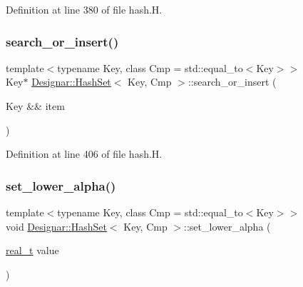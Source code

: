 Definition at line 380 of file hash.\+H.

\mbox{\label{class_designar_1_1_hash_set_a9ecd2f2a1e299cc35e90c66c8357beff}} 
\subsubsection{\texorpdfstring{search\+\_\+or\+\_\+insert()}{search\_or\_insert()}\hspace{0.1cm}{\footnotesize\ttfamily [2/2]}}
{\footnotesize\ttfamily template$<$typename Key, class Cmp = std\+::equal\+\_\+to$<$\+Key$>$$>$ \\
Key$\ast$ \hyperlink{class_designar_1_1_hash_set}{Designar\+::\+Hash\+Set}$<$ Key, Cmp $>$\+::search\+\_\+or\+\_\+insert (\begin{DoxyParamCaption}\item[{Key \&\&}]{item }\end{DoxyParamCaption})\hspace{0.3cm}{\ttfamily [inline]}}



Definition at line 406 of file hash.\+H.

\mbox{\label{class_designar_1_1_hash_set_a263b1c2f045910e13f49fb4a295fbd27}} 
\subsubsection{\texorpdfstring{set\+\_\+lower\+\_\+alpha()}{set\_lower\_alpha()}}
{\footnotesize\ttfamily template$<$typename Key, class Cmp = std\+::equal\+\_\+to$<$\+Key$>$$>$ \\
void \hyperlink{class_designar_1_1_hash_set}{Designar\+::\+Hash\+Set}$<$ Key, Cmp $>$\+::set\+\_\+lower\+\_\+alpha (\begin{DoxyParamCaption}\item[{\hyperlink{namespace_designar_aca2c32af26808dbec1f3a3071fad25ce}{real\+\_\+t}}]{value }\end{DoxyParamCaption})\hspace{0.3cm}{\ttfamily [inline]}}




